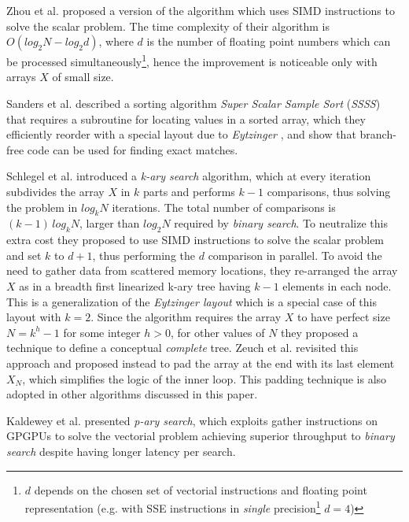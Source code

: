 \documentclass[preprint,1p,times]{elsarticle}
\begin{document}
Zhou et al. \cite{Zhou2002} proposed a version of the algorithm which uses SIMD instructions to solve the scalar problem. The time complexity of their algorithm is $O(log_2N-log_2d)$, where $d$ is the number of floating point numbers which can be processed simultaneously\footnote{$d$ depends on the chosen set of vectorial instructions and floating point representation (e.g. with SSE instructions in \textit{single} precision\footnote{for a description of \textit{single} and \textit{double} precision floating point representation see \cite{IEEE754}} $d=4$)}, hence the improvement is noticeable only with arrays $X$ of small size.

Sanders et al. \cite{Sanders2004} described a sorting algorithm \textit{Super Scalar Sample Sort}
(\textit{SSSS}) that requires a subroutine for locating values in a sorted array, which they efficiently reorder with a special layout due to \textit{Eytzinger} \cite{Eytzinger1590}, and show that branch-free code can be used for finding exact matches.

Schlegel et al. \cite{kary2009} introduced a \textit{k-ary search} algorithm, which at every iteration subdivides the array $X$ in $k$ parts and performs $k-1$ comparisons, thus solving the problem in $log_kN$ iterations. The total number of comparisons is $(k-1)\,log_kN$, larger than $log_2N$ required by \textit{binary search}. To neutralize this extra cost they proposed to use SIMD instructions to solve the scalar problem and set $k$ to $d+1$, thus performing the $d$ comparison in parallel. To avoid the need to gather data from scattered memory locations, they re-arranged the array $X$ as in a breadth first linearized k-ary tree having $k-1$ elements in each node. This is a generalization of the \textit{Eytzinger layout} which is a special case of this layout with $k=2$. Since the algorithm requires the array $X$ to have perfect size $N=k^h-1$ for some integer $h>0$, for other values of $N$ they proposed a technique to define a conceptual \textit{complete} tree. Zeuch et al. \cite{kary2014} revisited this approach and proposed instead to pad the array at the end with its last element $X_N$, which simplifies the logic of the inner loop. This padding technique is also adopted in other algorithms discussed in this paper.

Kaldewey et al. \cite{Kaldewey2009} presented \textit{p-ary search}, which exploits gather instructions on GPGPUs to solve the vectorial problem achieving superior throughput to \textit{binary search} despite having longer latency per search.
\end{document}
